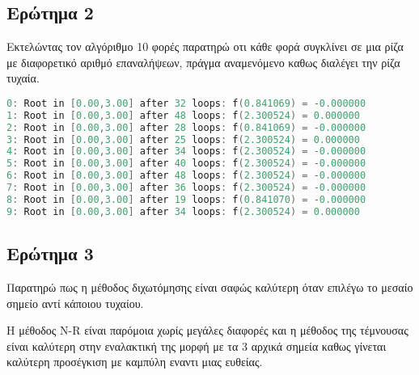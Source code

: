 \subsection{Ερώτημα 2}
Εκτελώντας τον αλγόριθμο 10 φορές παρατηρώ οτι κάθε φορά συγκλίνει σε μια ρίζα
με διαφορετικό αριθμό επαναλήψεων, πράγμα αναμενόμενο καθως
διαλέγει την ρίζα τυχαία.
\begin{lstlisting}[language=C, mathescape=true]
0: Root in [0.00,3.00] after 32 loops: f(0.841069) = -0.000000
1: Root in [0.00,3.00] after 48 loops: f(2.300524) = 0.000000
2: Root in [0.00,3.00] after 28 loops: f(0.841069) = -0.000000
3: Root in [0.00,3.00] after 25 loops: f(2.300524) = 0.000000
4: Root in [0.00,3.00] after 34 loops: f(2.300524) = -0.000000
5: Root in [0.00,3.00] after 40 loops: f(2.300524) = -0.000000
6: Root in [0.00,3.00] after 48 loops: f(2.300524) = -0.000000
7: Root in [0.00,3.00] after 36 loops: f(2.300524) = -0.000000
8: Root in [0.00,3.00] after 19 loops: f(0.841070) = -0.000000
9: Root in [0.00,3.00] after 34 loops: f(2.300524) = 0.000000
\end{lstlisting}

\subsection{Ερώτημα 3}

Παρατηρώ πως η μέθοδος διχωτόμησης είναι σαφώς καλύτερη όταν επιλέγω το μεσαίο
σημείο αντί κάποιου τυχαίου.

Η μέθοδος N-R είναι παρόμοια χωρίς μεγάλες διαφορές και η μέθοδος της
τέμνουσας είναι καλύτερη στην εναλακτική της μορφή με τα 3 αρχικά σημεία
καθως γίνεται καλύτερη προσέγκιση με καμπύλη εναντι μιας ευθείας.

